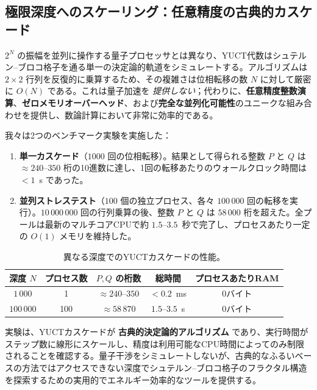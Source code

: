 \documentclass[11pt,a4paper]{article}
\begin{document}
	\subsection{極限深度へのスケーリング：任意精度の古典的カスケード}
	
	\(2^N\) の振幅を並列に操作する量子プロセッサとは異なり、YUCT代数はシュテルン–ブロコ格子を通る単一の決定論的軌道をシミュレートする。アルゴリズムは \(2\times2\) 行列を反復的に乗算するため、その複雑さは位相転移の数 \(N\) に対して厳密に \(O(N)\) である。これは量子加速を \emph{提供しない}；代わりに、\textbf{任意精度整数演算}、\textbf{ゼロメモリオーバーヘッド}、および\textbf{完全な並列化可能性}のユニークな組み合わせを提供し、数論計算において非常に効率的である。
	
	我々は2つのベンチマーク実験を実施した：
	
	\begin{enumerate}[leftmargin=*]
		\item \textbf{単一カスケード}（\(1000\) 回の位相転移）。結果として得られる整数 \(P\) と \(Q\) は \(\approx 240\)--\(350\) 桁の10進数に達し、1回の転移あたりのウォールクロック時間は \(<1\)~\textmu s であった。
		\item \textbf{並列ストレステスト}（\(100\) 個の独立プロセス、各々 \(100\,000\) 回の転移を実行）。\(10\,000\,000\) 回の行列乗算の後、整数 \(P\) と \(Q\) は \(58\,000\) 桁を超えた。全プールは最新のマルチコアCPUで約 \(1.5\)--\(3.5\)~秒で完了し、プロセスあたり一定の \(O(1)\) メモリを維持した。
	\end{enumerate}
	
	\begin{table}[htbp]
		\centering
		\caption{異なる深度でのYUCTカスケードの性能。}
		\label{tab:cascade-bench}
		\begin{tabular}{c c c c c}
			\toprule
			深度 \(N\) & プロセス数 & \(P,Q\) の桁数 & 総時間 & プロセスあたりRAM \\
			\midrule
			\(1\,000\)   & 1   & \(\approx 240\)--\(350\) & \(< 0.2\)\ ms & 0バイト \\
			\(100\,000\) & 100 & \(\approx 58\,870\)     & \(1.5\)--\(3.5\)\ s & 0バイト \\
			\bottomrule
		\end{tabular}
	\end{table}
	
	実験は、YUCTカスケードが \textbf{古典的決定論的アルゴリズム} であり、実行時間がステップ数に線形にスケールし、精度は利用可能なCPU時間によってのみ制限されることを確認する。量子干渉をシミュレートしないが、古典的なふるいベースの方法ではアクセスできない深度でシュテルン–ブロコ格子のフラクタル構造を探索するための実用的でエネルギー効率的なツールを提供する。
	
\end{document}
